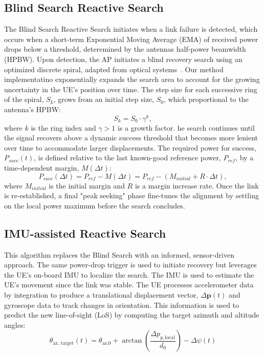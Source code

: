 \documentclass[fleqn,10pt]{wlscirep}
\begin{document}
\subsection*{Blind Search Reactive Search}
The Blind Search Reactive Search initiates when a link failure is detected, which occurs when a short-term Exponential Moving Average (EMA) of received power drops below a threshold, deteremined by the antennas half-power beamwidth (HPBW).
Upon detection, the AP initiates a blind recovery search using an optimized discrete spiral, adapted from optical systems~\cite{photonics11060540}. Our method implementatino exponentially expands the search area to account for the growing uncertainty in the UE's position over time. The step size for each successive ring of the spiral, $S_k$, grows from an initial step size, $S_0$, which proportional to the antenna's HPBW:
\begin{equation}
    S_k = S_0 \cdot \gamma^k,
\end{equation}
where $k$ is the ring index and $\gamma > 1$ is a growth factor.
he search continues until the signal recovers above a dynamic success threshold that becomes more lenient over time to accommodate larger displacements. The required power for success, $P_{succ}(t)$, is defined relative to the last known-good reference power, $P_{ref}$, by a time-dependent margin, $M(\Delta t)$:
\begin{equation}
    P_{succ}(\Delta t) = P_{ref} - M(\Delta t) = P_{ref} - (M_{initial} + R \cdot \Delta t),
\end{equation}
where $M_{initial}$ is the initial margin and $R$ is a margin increase rate. Once the link is re-established, a final "peak seeking" phase fine-tunes the alignment by settling on the local power maximum before the search concludes.

\subsection*{IMU-assisted Reactive Search}

This algorithm replaces the Blind Search with an informed, sensor-driven approach. The same power-drop trigger is used to initiate recovery but leverages the UE's on-board IMU to localize the search. The IMU is used to estimate the UE's movement since the link was stable. The UE processes accelerometer data by integration to produce a translational displacement vector, $\Delta\mathbf{p}(t)$ and gyroscope data to track changes in orientation. This information is used to predict the new line-of-sight (LoS) by computing the target azimuth and altitude angles: 
\begin{equation}
    \theta_{\text{az, target}}(t) = \theta_{\text{az,0}} + \arctan\left(\frac{\Delta p_{y, \text{local}}}{d_0}\right) - \Delta\psi(t)
\end{equation}
\end{document}

